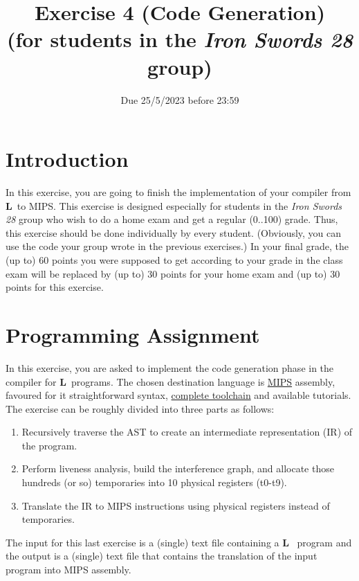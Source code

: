 \documentclass{article}
\begin{document}
\title{Exercise 4 (Code Generation)\\
\large{(for students in the \emph{Iron Swords 28} group)}}


\date{Due 25/5/2023 before 23:59}

\maketitle

\newcommand{\plname}{\textbf{L}\ }

\section{Introduction}
In this exercise, you are going to finish the implementation of your compiler from \plname to MIPS.
This exercise is designed especially for students in the \emph{Iron Swords 28} group who wish to do a home exam and get a regular (0..100) grade. Thus, this exercise should be done individually by every student. (Obviously, you can use the code your group wrote in the previous exercises.) In your final grade, the (up to) 60 points you were supposed to get according to your grade in the class exam will be replaced by (up to) 30 points for your home exam and (up to) 30 points for this exercise.


\section{Programming Assignment}
In this exercise, you are asked to implement the code generation phase in the compiler for \plname programs.
The chosen destination language is \href{https://en.wikipedia.org/wiki/MIPS_architecture}{MIPS}
assembly, favoured for it straightforward syntax,
\href{https://en.wikipedia.org/wiki/SPIM}{complete toolchain}
and available tutorials.
The exercise can be roughly divided into three parts as follows:
\begin{enumerate}
\item Recursively traverse the AST to create
an intermediate representation (IR) of the program.
\item Perform liveness analysis, build the interference graph,
and allocate those hundreds (or so) temporaries into 10 physical registers (t0-t9).
\item Translate the IR to MIPS instructions using physical registers instead of temporaries.
\end{enumerate}
The input for this last exercise is a (single) text file containing a \plname
program and the output is a (single) text file that contains the translation
of the input program into MIPS assembly.
\end{document}
